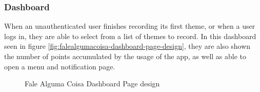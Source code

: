 \subsubsection{Dashboard}

When an unauthenticated user finishes recording its first theme, or when a user logs in, they are able to select from a list of themes to record. In this dashboard seen in figure \ref{fig:falealgumacoisa-dashboard-page-design}, they are also shown the number of points accumulated by the usage of the app, as well as able to open a menu and notification page.

\begin{figure}[ht]
    \centering
    \caption{Fale Alguma Coisa Dashboard Page design}

\end{figure}
